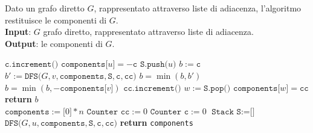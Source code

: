 \documentclass[14pt]{extreport}
\theoremstyle{definition}
\theoremstyle{definition}
\begin{document}
\begin{algorithm}[H]
    \caption{
        Dato un grafo diretto $G$, rappresentato attraverso liste di adiacenza, l'algoritmo restituisce le componenti di $G$.\\
        \textbf{Input}: $G$ grafo diretto, rappresentato attraverso liste di adiacenza.\\
        \textbf{Output}: le componenti di $G$.
    }

    \begin{algorithmic}[1]
            \State $\texttt{c.increment()}$
            \State $\texttt{components[}u\texttt{]} = - \texttt{c}$ 
            \State $\texttt{S.push(}u\texttt{)}$
            \State $b := \texttt{c}$
                    \State $b' := \texttt{DFS(}G, v, \texttt{components}, \texttt{S}, \texttt{c}, \texttt{cc)}$
                    \State $b = \min(b, b')$
                    \State $b = \min(b, - \texttt{components[}v\texttt{]})$
                \EndIf
            \EndFor
             
                \State $\texttt{cc.increment()}$
                \Do
                    \State $w := \texttt{S.pop()}$
                    \State $\texttt{components[}w\texttt{]} = \texttt{cc}$
            \EndIf
            \State \textbf{return} $b$
        \EndFunction
        \\
            \State $\texttt{components} := \texttt{[}0\texttt{]} * n$
            \State $\texttt{Counter cc} := 0$
            \State $\texttt{Counter c} := 0$
            \State $\texttt{Stack S} := \texttt{[}\texttt{]}$
                    \State $\texttt{DFS(}G, u, \texttt{components}, \texttt{S}, \texttt{c}, \texttt{cc)}$
                \EndIf
            \EndFor
            \State \textbf{return} \texttt{components}
        \EndFunction
    \end{algorithmic}
\end{algorithm}
\end{document}
